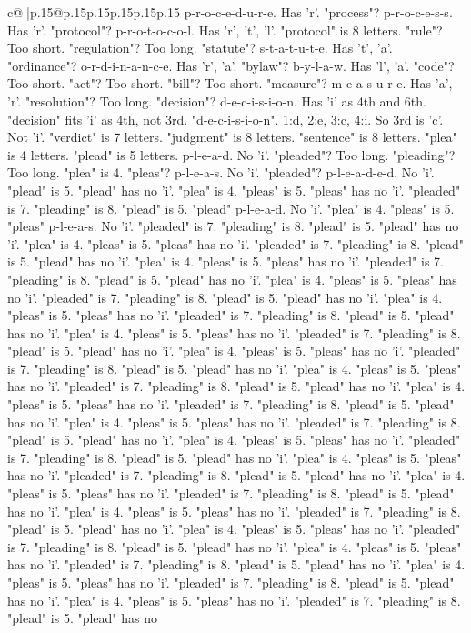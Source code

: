 \documentclass{article}
\begin{document}
{\begin{supertabular}{c@{$\;$}|p{.15\linewidth}@{}p{.15\linewidth}p{.15\linewidth}p{.15\linewidth}p{.15\linewidth}p{.15\linewidth}}
{{{p{-}r{-}o{-}c{-}e{-}d{-}u{-}r{-}e. Has 'r'. "process"? p{-}r{-}o{-}c{-}e{-}s{-}s. Has 'r'. "protocol"? p{-}r{-}o{-}t{-}o{-}c{-}o{-}l. Has 'r', 't', 'l'. "protocol" is 8 letters. "rule"? Too short. "regulation"? Too long. "statute"? s{-}t{-}a{-}t{-}u{-}t{-}e. Has 't', 'a'. "ordinance"? o{-}r{-}d{-}i{-}n{-}a{-}n{-}c{-}e. Has 'r', 'a'. "bylaw"? b{-}y{-}l{-}a{-}w. Has 'l', 'a'. "code"? Too short. "act"? Too short. "bill"? Too short. "measure"? m{-}e{-}a{-}s{-}u{-}r{-}e. Has 'a', 'r'. "resolution"? Too long. "decision"? d{-}e{-}c{-}i{-}s{-}i{-}o{-}n. Has 'i' as 4th and 6th. "decision" fits 'i' as 4th, not 3rd. "d{-}e{-}c{-}i{-}s{-}i{-}o{-}n". 1:d, 2:e, 3:c, 4:i. So 3rd is 'c'. Not 'i'. "verdict" is 7 letters. "judgment" is 8 letters. "sentence" is 8 letters. "plea" is 4 letters. "plead" is 5 letters. p{-}l{-}e{-}a{-}d. No 'i'. "pleaded"? Too long. "pleading"? Too long. "plea" is 4. "pleas"? p{-}l{-}e{-}a{-}s. No 'i'. "pleaded"? p{-}l{-}e{-}a{-}d{-}e{-}d. No 'i'. "plead" is 5. "plead" has no 'i'. "plea" is 4. "pleas" is 5. "pleas" has no 'i'. "pleaded" is 7. "pleading" is 8. "plead" is 5. "plead" p{-}l{-}e{-}a{-}d. No 'i'. "plea" is 4. "pleas" is 5. "pleas" p{-}l{-}e{-}a{-}s. No 'i'. "pleaded" is 7. "pleading" is 8. "plead" is 5. "plead" has no 'i'. "plea" is 4. "pleas" is 5. "pleas" has no 'i'. "pleaded" is 7. "pleading" is 8. "plead" is 5. "plead" has no 'i'. "plea" is 4. "pleas" is 5. "pleas" has no 'i'. "pleaded" is 7. "pleading" is 8. "plead" is 5. "plead" has no 'i'. "plea" is 4. "pleas" is 5. "pleas" has no 'i'. "pleaded" is 7. "pleading" is 8. "plead" is 5. "plead" has no 'i'. "plea" is 4. "pleas" is 5. "pleas" has no 'i'. "pleaded" is 7. "pleading" is 8. "plead" is 5. "plead" has no 'i'. "plea" is 4. "pleas" is 5. "pleas" has no 'i'. "pleaded" is 7. "pleading" is 8. "plead" is 5. "plead" has no 'i'. "plea" is 4. "pleas" is 5. "pleas" has no 'i'. "pleaded" is 7. "pleading" is 8. "plead" is 5. "plead" has no 'i'. "plea" is 4. "pleas" is 5. "pleas" has no 'i'. "pleaded" is 7. "pleading" is 8. "plead" is 5. "plead" has no 'i'. "plea" is 4. "pleas" is 5. "pleas" has no 'i'. "pleaded" is 7. "pleading" is 8. "plead" is 5. "plead" has no 'i'. "plea" is 4. "pleas" is 5. "pleas" has no 'i'. "pleaded" is 7. "pleading" is 8. "plead" is 5. "plead" has no 'i'. "plea" is 4. "pleas" is 5. "pleas" has no 'i'. "pleaded" is 7. "pleading" is 8. "plead" is 5. "plead" has no 'i'. "plea" is 4. "pleas" is 5. "pleas" has no 'i'. "pleaded" is 7. "pleading" is 8. "plead" is 5. "plead" has no 'i'. "plea" is 4. "pleas" is 5. "pleas" has no 'i'. "pleaded" is 7. "pleading" is 8. "plead" is 5. "plead" has no 'i'. "plea" is 4. "pleas" is 5. "pleas" has no 'i'. "pleaded" is 7. "pleading" is 8. "plead" is 5. "plead" has no 'i'. "plea" is 4. "pleas" is 5. "pleas" has no 'i'. "pleaded" is 7. "pleading" is 8. "plead" is 5. "plead" has no 'i'. "plea" is 4. "pleas" is 5. "pleas" has no 'i'. "pleaded" is 7. "pleading" is 8. "plead" is 5. "plead" has no 'i'. "plea" is 4. "pleas" is 5. "pleas" has no 'i'. "pleaded" is 7. "pleading" is 8. "plead" is 5. "plead" has no 'i'. "plea" is 4. "pleas" is 5. "pleas" has no 'i'. "pleaded" is 7. "pleading" is 8. "plead" is 5. "plead" has no }}}
\end{supertabular}}
\end{document}
